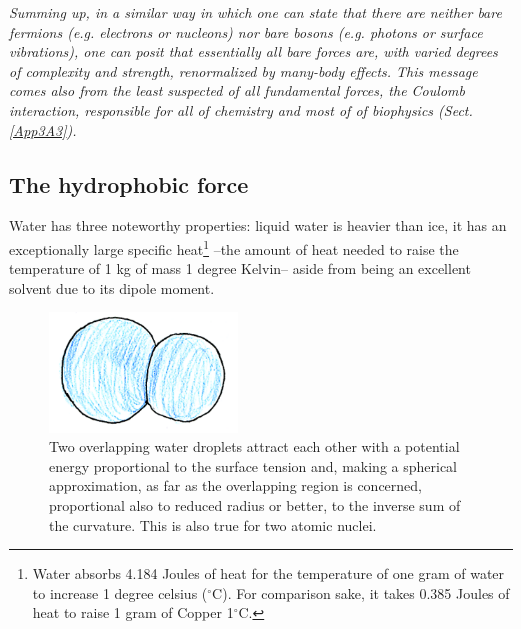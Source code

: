 \begin{subappendices}
\emph{Summing up, in a similar way in which one can state that there are neither bare fermions (e.g. electrons or nucleons) nor bare bosons (e.g. photons or surface vibrations),  one can posit that essentially all  bare
forces are, with varied degrees of complexity and strength, renormalized 
by many-body effects. This message comes also from  the least suspected of all fundamental forces, the Coulomb interaction, responsible for all of chemistry and most of of biophysics (Sect. \ref{App3A3}).}
\subsection{The hydrophobic force}
Water has three noteworthy properties: liquid water is heavier than ice, it has an exceptionally large specific heat\footnote{Water absorbs 4.184 Joules of heat for the temperature of one gram of water to increase 1 degree celsius ($^\circ$C). For comparison sake, it takes 0.385 Joules of heat to raise 1 gram of Copper 1$^\circ$C.} --the amount of heat needed to raise the temperature of 1 kg of mass 1 degree Kelvin-- aside from being an excellent solvent due to its dipole moment.
\begin{figure}
\centerline{\includegraphics[width=5cm]{C8/figsC8/fig6G4.pdf}}
\caption{Two overlapping water droplets attract each other with a potential energy proportional to the surface
tension and, making a spherical approximation, as far as the overlapping region is concerned, proportional
also to reduced radius or better, to the inverse sum of the curvature. This is also true for two atomic nuclei.}\label{fig6G4}
\end{figure}


\end{subappendices}
